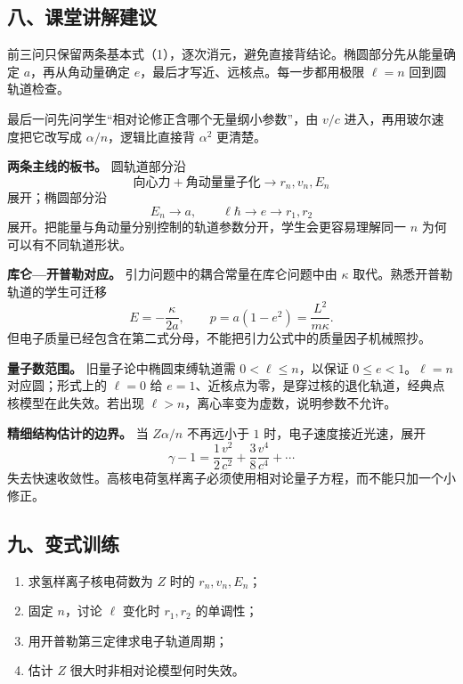 \documentclass[12pt,a4paper,UTF8]{ctexart}
\newcommand{\tightlist}{\setlength{\itemsep}{0pt}\setlength{\parskip}{0pt}}
\begin{document}
\subsection{八、课堂讲解建议}\label{ux516bux8bfeux5802ux8bb2ux89e3ux5efaux8bae-7}

前三问只保留两条基本式（1），逐次消元，避免直接背结论。椭圆部分先从能量确定
\(a\)，再从角动量确定 \(e\)，最后才写近、远核点。每一步都用极限
\(\ell=n\) 回到圆轨道检查。

最后一问先问学生``相对论修正含哪个无量纲小参数''，由 \(v/c\)
进入，再用玻尔速度把它改写成 \(\alpha/n\)，逻辑比直接背 \(\alpha^2\)
更清楚。

\textbf{两条主线的板书。} 圆轨道部分沿 \[
\text{向心力}+\text{角动量量子化}
\longrightarrow r_n,v_n,E_n
\] 展开；椭圆部分沿 \[
E_n\longrightarrow a,\qquad
\ell\hbar\longrightarrow e
\longrightarrow r_1,r_2
\] 展开。把能量与角动量分别控制的轨道参数分开，学生会更容易理解同一
\(n\) 为何可以有不同轨道形状。

\textbf{库仑---开普勒对应。} 引力问题中的耦合常量在库仑问题中由
\(\kappa\) 取代。熟悉开普勒轨道的学生可迁移 \[
E=-\frac{\kappa}{2a},\qquad
p=a(1-e^2)=\frac{L^2}{m\kappa}.
\] 但电子质量已经包含在第二式分母，不能把引力公式中的质量因子机械照抄。

\textbf{量子数范围。} 旧量子论中椭圆束缚轨道需 \(0<\ell\le n\)，以保证
\(0\le e<1\)。\(\ell=n\) 对应圆；形式上的 \(\ell=0\) 给
\(e=1\)、近核点为零，是穿过核的退化轨道，经典点核模型在此失效。若出现
\(\ell>n\)，离心率变为虚数，说明参数不允许。

\textbf{精细结构估计的边界。} 当 \(Z\alpha/n\) 不再远小于 \(1\)
时，电子速度接近光速，展开 \[
\gamma-1=\frac12\frac{v^2}{c^2}
+\frac38\frac{v^4}{c^4}+\cdots
\]
失去快速收敛性。高核电荷氢样离子必须使用相对论量子方程，而不能只加一个小修正。

\subsection{九、变式训练}\label{ux4e5dux53d8ux5f0fux8badux7ec3-7}

\begin{enumerate}
\def\labelenumi{\arabic{enumi}.}
\tightlist
\item
  求氢样离子核电荷数为 \(Z\) 时的 \(r_n,v_n,E_n\)；
\item
  固定 \(n\)，讨论 \(\ell\) 变化时 \(r_1,r_2\) 的单调性；
\item
  用开普勒第三定律求电子轨道周期；
\item
  估计 \(Z\) 很大时非相对论模型何时失效。
\end{enumerate}
\end{document}
